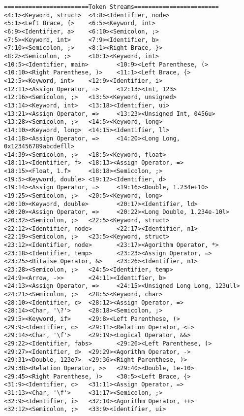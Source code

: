 \documentclass[lang=cn,11pt,a4paper]{paper}
\begin{document}
\begin{lstlisting}
========================Token Streams========================
<4:1><Keyword, struct>  <4:8><Identifier, node>
<5:1><Left Brace, {>    <6:5><Keyword, int>
<6:9><Identifier, a>    <6:10><Semicolon, ;>
<7:5><Keyword, int>     <7:9><Identifier, b>
<7:10><Semicolon, ;>    <8:1><Right Brace, }>
<8:2><Semicolon, ;>     <10:1><Keyword, int>
<10:5><Identifier, main>        <10:9><Left Parenthese, (>
<10:10><Right Parenthese, )>    <11:1><Left Brace, {>
<12:5><Keyword, int>    <12:9><Identifier, i>
<12:11><Assign Operator, =>     <12:13><Int, 123>
<12:16><Semicolon, ;>   <13:5><Keyword, unsigned>
<13:14><Keyword, int>   <13:18><Identifier, ui>
<13:21><Assign Operator, =>     <13:23><Unsigned Int, 0456u>
<13:28><Semicolon, ;>   <14:5><Keyword, long>
<14:10><Keyword, long>  <14:15><Identifier, ll>
<14:18><Assign Operator, =>     <14:20><Long Long, 0x123456789abcdefll>
<14:39><Semicolon, ;>   <18:5><Keyword, float>
<18:11><Identifier, f>  <18:13><Assign Operator, =>
<18:15><Float, 1.f>     <18:18><Semicolon, ;>
<19:5><Keyword, double> <19:12><Identifier, d>
<19:14><Assign Operator, =>     <19:16><Double, 1.234e+10>
<19:25><Semicolon, ;>   <20:5><Keyword, long>
<20:10><Keyword, double>        <20:17><Identifier, ld>
<20:20><Assign Operator, =>     <20:22><Long Double, 1.234e-10l>
<20:32><Semicolon, ;>   <22:5><Keyword, struct>
<22:12><Identifier, node>       <22:17><Identifier, n1>
<22:19><Semicolon, ;>   <23:5><Keyword, struct>
<23:12><Identifier, node>       <23:17><Agorithm Operator, *>
<23:18><Identifier, temp>       <23:23><Assign Operator, =>
<23:25><Bitwise Operator, &>    <23:26><Identifier, n1>
<23:28><Semicolon, ;>   <24:5><Identifier, temp>
<24:9><Arrow, ->>       <24:11><Identifier, b>
<24:13><Assign Operator, =>     <24:15><Unsigned Long Long, 123ull>
<24:21><Semicolon, ;>   <28:5><Keyword, char>
<28:10><Identifier, c>  <28:12><Assign Operator, =>
<28:14><Char, '\?'>     <28:18><Semicolon, ;>
<29:5><Keyword, if>     <29:8><Left Parenthese, (>
<29:9><Identifier, c>   <29:11><Relation Operator, <=>
<29:14><Char, '\f'>     <29:19><Logical Operator, &&>
<29:22><Identifier, fabs>       <29:26><Left Parenthese, (>
<29:27><Identifier, d>  <29:29><Agorithm Operator, ->
<29:31><Double, 123e7>  <29:36><Right Parenthese, )>
<29:38><Relation Operator, >>   <29:40><Double, 1e-10>
<29:45><Right Parenthese, )>    <30:5><Left Brace, {>
<31:9><Identifier, c>   <31:11><Assign Operator, =>
<31:13><Char, '\f'>     <31:17><Semicolon, ;>
<32:9><Identifier, i>   <32:10><Agorithm Operator, ++>
<32:12><Semicolon, ;>   <33:9><Identifier, ui>

\end{lstlisting}
\end{document}
